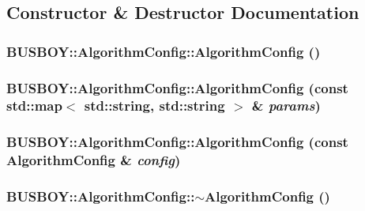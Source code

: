 \subsection{Constructor \& Destructor Documentation}
\hypertarget{classBUSBOY_1_1AlgorithmConfig_ae72567ccc22853d6a99f72b5c0451ea8}{
\subsubsection[{AlgorithmConfig}]{\setlength{\rightskip}{0pt plus 5cm}BUSBOY::AlgorithmConfig::AlgorithmConfig ()}}
\label{classBUSBOY_1_1AlgorithmConfig_ae72567ccc22853d6a99f72b5c0451ea8}
\hypertarget{classBUSBOY_1_1AlgorithmConfig_ae18ccf9ed85ff25bd73ca4133ec73817}{
\subsubsection[{AlgorithmConfig}]{\setlength{\rightskip}{0pt plus 5cm}BUSBOY::AlgorithmConfig::AlgorithmConfig (const std::map$<$ std::string, std::string $>$ \& {\em params})}}
\label{classBUSBOY_1_1AlgorithmConfig_ae18ccf9ed85ff25bd73ca4133ec73817}
\hypertarget{classBUSBOY_1_1AlgorithmConfig_a0af971a3e21bc483762d559a2aa876dc}{
\subsubsection[{AlgorithmConfig}]{\setlength{\rightskip}{0pt plus 5cm}BUSBOY::AlgorithmConfig::AlgorithmConfig (const {\bf AlgorithmConfig} \& {\em config})}}
\label{classBUSBOY_1_1AlgorithmConfig_a0af971a3e21bc483762d559a2aa876dc}
\hypertarget{classBUSBOY_1_1AlgorithmConfig_ad515c07281984d56af000ab0e9359e76}{
\subsubsection[{$\sim$AlgorithmConfig}]{\setlength{\rightskip}{0pt plus 5cm}BUSBOY::AlgorithmConfig::$\sim$AlgorithmConfig ()}}
\label{classBUSBOY_1_1AlgorithmConfig_ad515c07281984d56af000ab0e9359e76}


